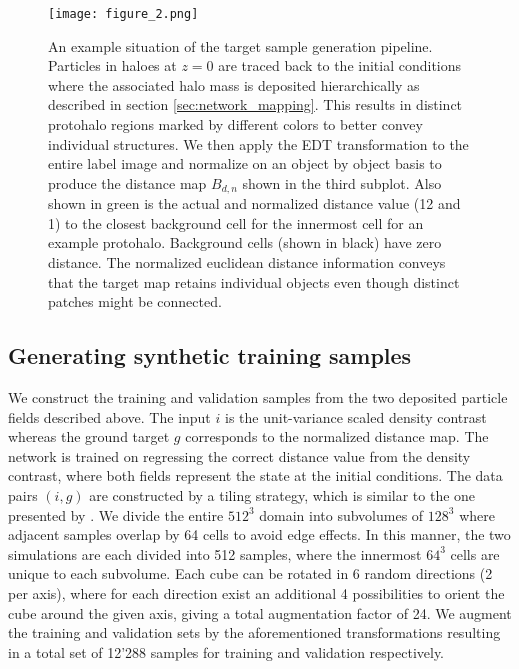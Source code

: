 \documentclass[fleqn,usenatbib]{mnras}
\begin{document}
\begin{figure}
    \begin{minipage}[t]{0.5\columnwidth}
        \vspace{0pt}
        \texttt{[image: figure\_2.png]}
    \end{minipage}\hfill
    \begin{minipage}[t]{0.47\columnwidth}
        \vspace{0pt}
        \caption{An example situation of the target sample generation pipeline. Particles in haloes at $z=0$ are traced back to the initial conditions where the associated halo mass is deposited hierarchically as described in section \ref{sec:network_mapping}. This results in distinct protohalo regions marked by different colors to better convey individual structures. We then apply the EDT transformation to the entire label image and normalize on an object by object basis to produce the distance map $B_{d,n}$ shown in the third subplot. Also shown in green is the actual and normalized distance value (12 and 1) to the closest background cell for the innermost cell for an example protohalo. Background cells (shown in black) have zero distance. The normalized euclidean distance information conveys that the target map retains individual objects even though distinct patches might be connected.}
        \label{fig:overview}
    \end{minipage}
\end{figure}

\subsection{Generating synthetic training samples}
We construct the training and validation samples from the two deposited particle fields described above. The input $i$ is the unit-variance scaled density contrast whereas the ground target $g$ corresponds to the normalized distance map. The network is trained on regressing the correct distance value from the density contrast, where both fields represent the state at the initial conditions. The data pairs $(i,g)$ are constructed by a tiling strategy, which is similar to the one presented by \cite{Berger2019}. We divide the entire $512^{3}$ domain into subvolumes of $128^{3}$ where adjacent samples overlap by 64 cells to avoid edge effects. In this manner, the two simulations are each divided into 512 samples, where the innermost $64^{3}$ cells are unique to each subvolume. 
Each cube can be rotated in 6 random directions (2 per axis), where for each direction exist an additional 4 possibilities to orient the cube around the given axis, giving a total augmentation factor of 24. We augment the training and validation sets by the aforementioned transformations resulting in a total set of 12'288 samples for training and validation respectively.
\end{document}
